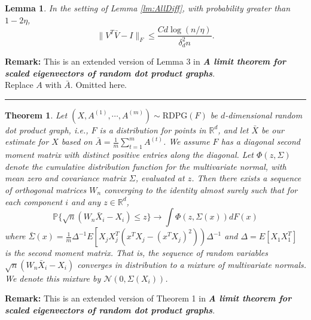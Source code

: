 \documentclass[a4paper]{article}
\newenvironment{proof}{{\bf Proof:  }}{\hfill\rule{2mm}{2mm}}
\newtheorem{lemma}[fact]{Lemma}
\newtheorem{theorem}[fact]{Theorem}
\begin{document}
\begin{lemma}
\label{lm:VVhatDiff}
In the setting of Lemma \ref{lm:AllDiff}, with probability greater than $1-2\eta$,
\[
	\|V^T \bar{V} - I \|_F \le \frac{C d \log(n/\eta)}{\delta_d^2 n}.
\]
\end{lemma}
\textbf{Remark:} This is an extended version of Lemma 3 in \textbf{\textit{A limit theorem for scaled eigenvectors of random dot product graphs}}. \\
\begin{proof}
Replace $A$ with $\bar{A}$. Omitted here.
\end{proof}







\begin{theorem}
\label{thm:clt}
Let $(X, A^{(1)}, \cdots, A^{(m)}) \sim \mathrm{RDPG}(F)$ be $d$-dimensional random dot product graph, i.e., $F$ is a distribution for points in $\mathbb{R}^d$, and let $\bar{X}$ be our estimate for $X$ based on $\bar{A} = \frac{1}{m} \sum_{t = 1}^m A^{(t)}$. We assume $F$ has a diagonal second moment matrix with distinct positive entries along the diagonal. Let $\Phi(z, \Sigma)$ denote the cumulative distribution function for the multivariate normal, with mean zero and covariance matrix $\Sigma$, evaluated at $z$. Then there exists a sequence of orthogonal matrices $W_n$ converging to the identity almost surely such that for each component $i$ and any $z \in \mathbb{R}^d$,
\[
	\mathbb{P}\{ \sqrt{n}(W_n \bar{X}_i - X_i) \le z \} \rightarrow \int \Phi(z, \Sigma(x)) dF(x)
\]
where $\bar{\Sigma}(x) = \frac{1}{m} \Delta^{-1} E \left[ X_j X_j^T (x^T X_j - (x^T X_j)^2 ) \right) \Delta^{-1}$ and $\Delta = E[X_1 X_1^T]$ is the second moment matrix. That is, the sequence of random variables $\sqrt{n}(W_n \bar{X}_i - X_i)$ converges in distribution to a mixture of multivariate normals. We denote this mixture by $\mathcal{N}(0, \Sigma(X_i))$.
\end{theorem}
\textbf{Remark:} This is an extended version of Theorem 1 in \textbf{\textit{A limit theorem for scaled eigenvectors of random dot product graphs}}. \\
\end{document}

